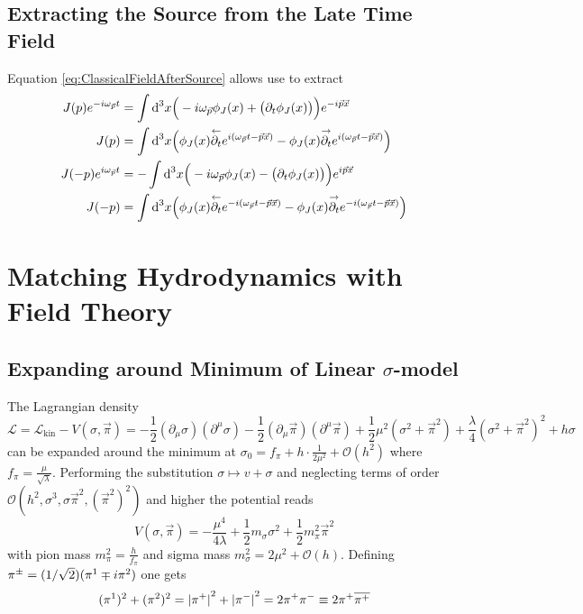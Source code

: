 \subsection{Extracting the Source from the Late Time Field}

Equation \eqref{eq:ClassicalFieldAfterSource} allows use to extract
\begin{subequations}
    \begin{align}        
        J(p)e^{-{i}\omega_{\vec{p}}t}&=\int\text{d}^3x\Big(-{i}\omega_{\vec{p}}\phi_J(x)+\big(\partial_t\phi_J(x)\big)\Big)e^{-{i}\vec{p}\vec{x}}\\
        J(p)&=\int\text{d}^3x\Big(\phi_J(x)\overset{\leftarrow}{\partial_t}e^{{i}(\omega_{\vec{p}}t-\vec{p}\vec{x})}-\phi_J(x)\overset{\rightarrow}{\partial_t}e^{{i}(\omega_{\vec{p}}t-\vec{p}\vec{x})}\Big)\\
        J(-p)e^{{i}\omega_{\vec{p}}t}&=-\int\text{d}^3x\Big(-{i}\omega_{\vec{p}}\phi_J(x)-\big(\partial_t\phi_J(x)\big)\Big)e^{{i}\vec{p}\vec{x}}\\
        J(-p)&=\int\text{d}^3x\Big(\phi_J(x)\overset{\leftarrow}{\partial_t}e^{-{i}(\omega_{\vec{p}}t-\vec{p}\vec{x})}-\phi_J(x)\overset{\rightarrow}{\partial_t}e^{-{i}(\omega_{\vec{p}}t-\vec{p}\vec{x})}\Big)
    \end{align}
    \label{eq:SourceFieldRelation}
\end{subequations} 

\section{Matching Hydrodynamics with Field Theory}

\subsection{Expanding around Minimum of Linear $\sigma$-model}

The Lagrangian density
\begin{equation}
    \mathscr{L}=\mathcal{L}_{\text{kin}}-V(\sigma,\vec{\pi})=-\frac{1}{2}(\partial_\mu\sigma)(\partial^\mu\sigma)-\frac{1}{2}(\partial_\mu\vec{\pi})(\partial^\mu\vec{\pi})+\frac{1}{2}\mu^2(\sigma^2+\vec{\pi}^2)+\frac{\lambda}{4}(\sigma^2+\vec{\pi}^2)^2+h\sigma
\end{equation}
can be expanded around the minimum at $\sigma_0=f_\pi+h\cdot\frac{1}{2\mu^2}+\mathcal{O}(h^2)$ where $f_\pi=\frac{\mu}{\sqrt{\lambda}}$. Performing the substitution $\sigma\mapsto v+\sigma$ and neglecting terms of order $\mathcal{O}(h^2,\sigma^3,\sigma\vec{\pi}^2,(\vec{\pi}^2)^2)$ and higher the potential reads
\begin{equation}
    V(\sigma,\vec{\pi})=-\frac{\mu^4}{4\lambda}+\frac{1}{2}m_\sigma\sigma^2+\frac{1}{2}m_\pi^2\vec{\pi}^2
\end{equation}
with pion mass $m_\pi^2=\frac{h}{f_\pi}$ and sigma mass $m_\sigma^2=2\mu^2+\mathcal{O}(h)$. Defining $\pi^\pm=(1/\sqrt{2})(\pi^1\mp{i}\pi^2)$ one gets 
\begin{equation}
    (\pi^1)^2+(\pi^2)^2={\vert\pi^+\vert}^2+{\vert\pi^-\vert}^2=2\pi^+\pi^-\equiv 2\pi^+\overline{\pi^+}
\end{equation}

